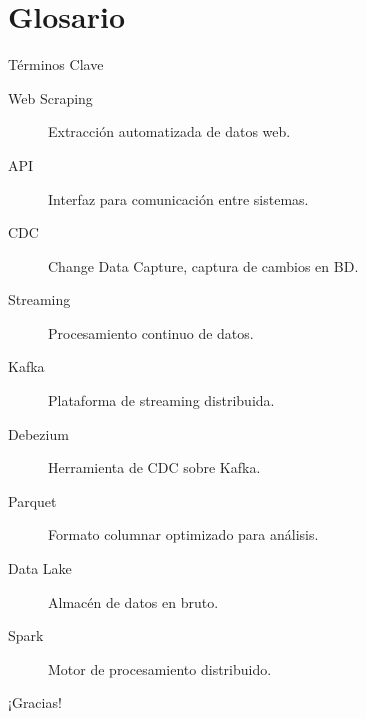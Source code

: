 \documentclass[aspectratio=169, 10pt, xcolor=table]{beamer}
\begin{document}
\section{Glosario}

\begin{frame}{Términos Clave}
    \begin{description}
        \item[Web Scraping] Extracción automatizada de datos web.
        \item[API] Interfaz para comunicación entre sistemas.
        \item[CDC] Change Data Capture, captura de cambios en BD.
        \item[Streaming] Procesamiento continuo de datos.
        \item[Kafka] Plataforma de streaming distribuida.
        \item[Debezium] Herramienta de CDC sobre Kafka.
        \item[Parquet] Formato columnar optimizado para análisis.
        \item[Data Lake] Almacén de datos en bruto.
        \item[Spark] Motor de procesamiento distribuido.
    \end{description}
\end{frame}

\begin{frame}
    \centering

    
    \vspace{1cm}
    \large ¡Gracias!
\end{frame}
\end{document}
